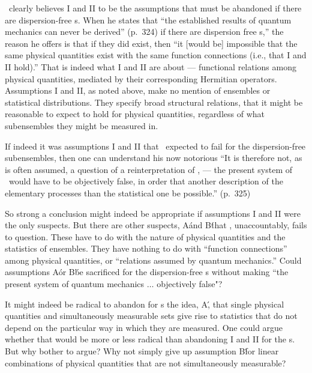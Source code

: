 \vskip 5pt
 
 
\VN\ clearly believes I and II to be the assumptions that must be abandoned if there are dispersion-free \se s.   
When he states  that ``the established results of quantum mechanics can never be derived'' (p.~324) if there are dispersion free \se s,'' the reason he offers is that if they did exist, then ``it [would be] impossible that the same physical quantities exist with the same function connections (i.e., that I and II hold).''   That is indeed what I and II are about --- functional relations among physical quantities, mediated by their corresponding Hermitian operators.  Assumptions I and II, as noted above,  make no mention of ensembles or statistical distributions.  They specify broad structural relations, that it might be reasonable to expect to hold for physical quantities, regardless of what subensembles they might be measured in.

If indeed it was assumptions I and II that \vN\ expected to fail for the dispersion-free subensembles, then one can understand  his now notorious ``It is therefore not, as is often assumed, a question of a reinterpretation of \qm, --- the present system of \qm\ would have to be objectively false, in order that another description of the elementary processes than the statistical one be possible.''  (p.~325)

So strong a conclusion might indeed be appropriate if assumptions I and II were the only suspects.   But there are other suspects, A\' and B\' that \vN, unaccountably, fails to question.  These have to do with the nature of physical quantities and the statistics of ensembles.   They have nothing to do with  ``function connections''  among physical quantities,
 or ``relations assumed by quantum mechanics.''   Could assumptions A\' or B\' be sacrificed for the dispersion-free \se s without making ``the present system of quantum mechanics $\ldots$ objectively false"?
 
It might indeed be  radical to abandon for \se s the idea, A\',  that single physical  quantities  and simultaneously measurable sets give rise to statistics that do not depend on the particular way in which they are measured.   One could argue whether that would be more or less radical than abandoning I and II for the \se s.    But why bother to argue?    Why not simply give up assumption B\' for linear combinations of physical quantities that are not simultaneously measurable?  

